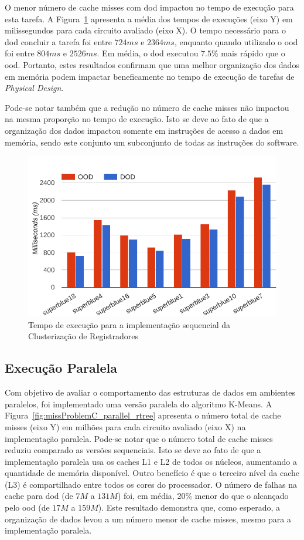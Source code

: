 O menor número de cache misses com \ac{dod} impactou no tempo de execução para esta tarefa.
A Figura~\ref{fig:runtimeProblemC_sequential_rtree} apresenta a média dos tempos de execuções (eixo Y) em milissegundos para cada circuito avaliado (eixo X).
O tempo necessário para o \ac{dod} concluir a tarefa foi entre $724ms$ e $2364ms$, enquanto quando utilizado o \ac{ood} foi entre $804ms$ e $2526ms$.
Em média, o \ac{dod} executou $7.5\%$ mais rápido que o \ac{ood}.
Portanto, estes resultados confirmam que uma melhor organização dos dados em memória podem impactar beneficamente no tempo de execução de tarefas de \textit{Physical Design}.

Pode-se notar também que a redução no número de cache misses não impactou na mesma proporção no tempo de execução. Isto se deve ao fato de que a organização dos dados impactou somente em instruções de acesso a dados em memória, sendo este conjunto um subconjunto de todas as instruções do software.

\begin{figure}[ht]
    \centering
    \includegraphics[width=0.7\linewidth]{img/results/runtimeProblemC_sequential_rtree}
    \caption[Tempo de execução Problema~C versão sequencial]{Tempo de execução para a implementação sequencial da Clusterização de Registradores}
    \label{fig:runtimeProblemC_sequential_rtree}
\end{figure}

\subsection{Execução Paralela}
\label{subsec:execucaoParalelaProblemaC}

Com objetivo de avaliar o comportamento das estruturas de dados em ambientes paralelos, foi implementado uma versão paralela do algoritmo K-Means.
A Figura~\ref{fig:missProblemC_parallel_rtree} apresenta o número total de cache misses (eixo Y) em milhões para cada circuito avaliado (eixo X) na implementação paralela.
Pode-se notar que o número total de cache misses reduziu comparado as versões sequenciais. Isto se deve ao fato de que a implementação paralela usa os caches L1 e L2 de todos os núcleos, aumentando a quantidade de memória disponível. Outro benefício é que o terceiro nível da cache (L3) é compartilhado entre todos os cores do processador.
O número de falhas na cache para \ac{dod} (de $7M$ a $131M$) foi, em média, $20\%$ menor do que o alcançado pelo \ac{ood} (de $17M$ a $159M$). Este resultado demonstra que, como esperado, a organização de dados levou a um número menor de cache misses, mesmo para a implementação paralela.


